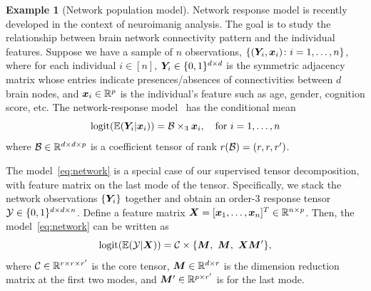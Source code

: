 \documentclass[12pt]{article}
\theoremstyle{plain}
\theoremstyle{definition}
\newtheorem{example}{Example}
\begin{document}
\begin{example}[Network population model] 
Network response model is recently developed in the context of neuroimanig analysis. The goal is to study the relationship between brain network connectivity pattern and the individual features. Suppose we have a sample of $n$ observations, $\{(\bm Y_i, \bm x_i)\colon i=1,\ldots,n\}$, where for each individual $i\in[n]$, $\bm Y_i\in\{0,1\}^{d\times d}$ is the symmetric adjacency matrix whose entries indicate presences/absences of connectivities between $d$ brain nodes, and $\bm x_i\in\mathbb{R}^p$ is the individual's feature such as age, gender, cognition score, etc. The network-response model~\citep{rabusseau2016low, zhang2018network} has the conditional mean
\begin{equation}\label{eq:network}
\text{logit}(\mathbb{E}(\bm Y_i|\bm x_i))=\mathcal{B}\times_3\bm x_i, \quad \text{for }i=1,\ldots,n
\end{equation}
where $\mathcal{B}\in \mathbb{R}^{d\times d\times p}$ is a coefficient tensor of rank $r(\mathcal{B})=(r,r,r')$.

The model~\eqref{eq:network} is a special case of our supervised tensor decomposition, with feature matrix on the last mode of the tensor. Specifically, we stack the network observations $\{\bm Y_i\}$ together and obtain an order-3 response tensor $\mathcal{Y}\in\{0,1\}^{d\times d\times n}$. Define a feature matrix $\bm X=[\bm x_1,\ldots,\bm x_n]^T\in\mathbb{R}^{n\times p}$. Then, the model~\eqref{eq:network} can be written as
\[
\text{logit}(\mathbb{E}(\tY|\mX))=\tC\times\{\mM,\ \mM,\ \mX\mM'\},
\]
where $\mathcal{C}\in\mathbb{R}^{r\times r\times r'}$ is the core tensor, $\bm M\in\mathbb{R}^{d\times r}$ is the dimension reduction matrix at the first two modes, and $\bm M'\in\mathbb{R}^{p\times r'}$ is for the last mode.  \end{example}
 
\end{document}
